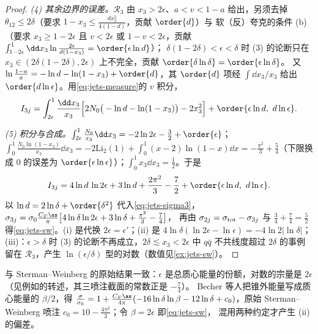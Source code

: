 \begin{proof}
\emph{(4) 其余边界的误差。}$\mathcal R_3$ 由 $x_3>2\epsilon$、$a<v<1-a$ 给出，另须去掉 $\theta_{12}\le2\delta$（要求 $1-x_3\le\frac{dx_3^2}{4(1-d)}$，贡献 $\order{d}$）与
软（反）夸克的条件 (b)（要求 $x_3\ge1-2\epsilon$ 且 $v<2\epsilon$ 或 $1-v<2\epsilon$，贡献 $\int_{1-2\epsilon}^1\dd x_3\ln\frac{2\epsilon}{d(1-x_3)}=\order{\epsilon\ln d}$）；
$\delta(1-2\delta)<\epsilon<\delta$ 时 (3) 的论断只在 $x_3\in(2\delta(1-2\delta),2\epsilon)$ 上不完全，贡献 $\order{\delta\ln\delta}=\order{\epsilon\ln\delta}$。
又 $\ln\frac{1-a}{a}=-\ln d-\ln(1-x_3)+\order{d}$，其 $\order{d}$ 项经 $\int\dd x_3/x_3$ 给出 $\order{d\ln\epsilon}$。用\cref{eq:jets-measure}的 $v$ 积分，
\begin{equation}\label{eq:jets-I3-asym}
I_{3j}=\int_{2\epsilon}^1\frac{\dd x_3}{x_3}\Big[2N_0\big(-\ln d-\ln(1-x_3)\big)-2x_3^2\Big]+\order{\epsilon\ln d,\ d\ln\epsilon}.
\end{equation}

\emph{(5) 积分与合成。}$\int_{2\epsilon}^1\frac{N_0}{x_3}\dd x_3=-2\ln2\epsilon-\frac32+\order{\epsilon}$；
$\int_0^1\frac{N_0\ln(1-x_3)}{x_3}\dd x_3=-2\mathrm{Li}_2(1)+\int_0^1(x-2)\ln(1-x)\dd x=-\frac{\pi^2}{3}+\frac54$（下限换成 $0$ 的误差为 $\order{\epsilon\ln\epsilon}$）；$\int_0^1x_3\dd x_3=\frac12$。于是
\begin{equation}\label{eq:jets-I3-result}
I_{3j}=4\ln d\,\ln2\epsilon+3\ln d+\frac{2\pi^2}{3}-\frac72+\order{\epsilon\ln d,\ d\ln\epsilon}.
\end{equation}
以 $\ln d=2\ln\delta+\order{\delta^2}$ 代入\cref{eq:jets-sigma3}，$\sigma_{3j}=\sigma_0\frac{C_F\as}{\pi}\big[4\ln\delta\ln2\epsilon+3\ln\delta+\frac{\pi^2}{3}-\frac74\big]$，
再由 $\sigma_{2j}=\sigma_{\rm tot}-\sigma_{3j}$ 与 $\frac34+\frac74=\frac52$ 得\cref{eq:jets-sw}。(i) 是代换 $2\epsilon=\epsilon'$；(ii) 是 $4\ln\delta(\ln2\epsilon-\ln\epsilon)=-4\ln2|\ln\delta|$；
(iii)：$\epsilon>\delta$ 时 (3) 的论断不再成立，$2\delta\lesssim x_3<2\epsilon$ 中 $q\bar q$ 不共线度超过 $2\delta$ 的事例留在 $\mathcal R_3$，产生 $\ln(\epsilon/\delta)$ 型的对数（数值见\cref{ex:jets-sw}）。
\end{proof}

与 Sterman--Weinberg 的原始结果一致：$\epsilon$ 是总质心能量的份额，对数的宗量是 $2\epsilon$（见例如\cite[式~(25)、(28)]{Ali:2010tw}的转述，其三喷注截面的常数正是 $-\frac74$）。
Becher 等人把锥外能量写成质心能量的 $\beta/2$，得
$\frac{\sigma}{\sigma_0}=1+\frac{C_F\as}{4\pi}(-16\ln\delta\ln\beta-12\ln\delta+c_0)$，原始 Sterman--Weinberg 喷注 $c_0=10-\frac{4\pi^2}{3}$\cite[式~(1)]{Becher:2015hka}；令 $\beta=2\epsilon$ 即\cref{eq:jets-sw}，
混用两种约定才产生 (ii) 的偏差。

